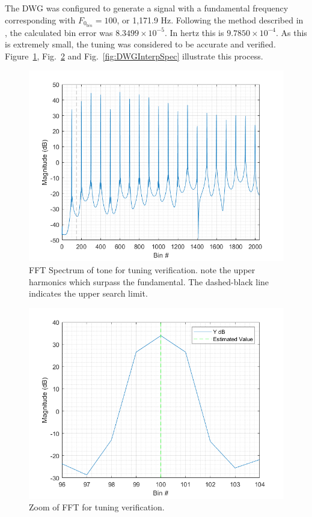 \documentclass[../main.tex]{subfiles}
\begin{document}
The DWG was configured to generate a signal with a fundamental frequency corresponding with $F_{0_{bin}} = 100$, or 1,171.9 Hz. Following the method described in , the calculated bin error was $8.3499 \times 10^{-5}$. In hertz this is $9.7850 \times 10^{-4}$. As this is extremely small, the tuning was considered to be accurate and verified. Figure~\ref{fig:DWGInterpBins}, Fig.~\ref{fig:DWGInterpBinsZoom} and Fig.~\ref{fig:DWGInterpSpec} illustrate this process.

\begin{figure}[h]
    \centering
    \includegraphics[scale=.65]{./images/plots/StringDWGInterpBins.png}
    \caption{FFT Spectrum of tone for tuning verification. note the upper harmonics which surpass the fundamental. The dashed-black line indicates the upper search limit.}
    \label{fig:DWGInterpBins}
\end{figure}

\begin{figure}[h!]
    \centering
    \includegraphics[scale=.58]{./images/plots/StringDWGInterpBinsZoom.png}
    \caption{Zoom of FFT for tuning verification.}
    \label{fig:DWGInterpBinsZoom}
\end{figure}
\end{document}
